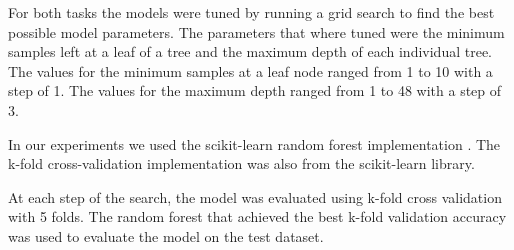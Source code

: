 For both tasks the models were tuned by running a grid search to find the best possible model parameters. The parameters that where tuned were the minimum samples left at a leaf of a tree and the maximum depth of each individual tree. The values for the minimum samples at a leaf node ranged from 1 to 10 with a step of 1. The values for the maximum depth ranged from 1 to 48 with a step of 3.

In our experiments we used the scikit-learn random forest implementation \cite{sklearn}. The k-fold cross-validation implementation was also from the scikit-learn library.

At each step of the search, the model was evaluated using k-fold cross validation with 5 folds. The random forest that achieved the best k-fold validation accuracy was used to evaluate the model on the test dataset.


